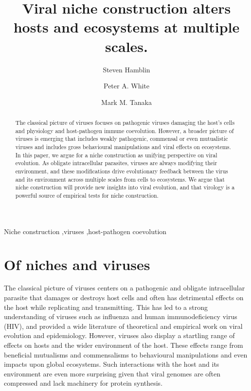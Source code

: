 \documentclass[review,draft,12pt]{elsarticle}
\begin{document}
\begin{frontmatter}
  \title{Viral niche construction alters hosts and ecosystems at multiple scales.}
  \author[babs]{Steven Hamblin}
  \author[babs]{Peter A. White}
  \author[babs]{Mark M. Tanaka}

  \address[unsw]{School of Biotechnology and Biomolecular Sciences, University of New South Wales, Sydney, Australia 2052}
 

\begin{abstract}
The classical picture of viruses focuses on pathogenic viruses damaging the host’s cells and physiology and host-pathogen immune coevolution. However, a broader picture of viruses is emerging that includes weakly pathogenic, commensal or even mutualistic viruses and includes gross behavioural manipulations and viral effects on ecosystems. In this paper, we argue for a niche construction as unifying perspective on viral evolution. As obligate intracellular parasites, viruses are always modifying their environment, and these modifications drive evolutionary feedback between the virus and its environment across multiple scales from cells to ecosystems. We argue that niche construction will provide new insights into viral evolution, and that virology is a powerful source of empirical tests for niche construction. 
\end{abstract}

\begin{keyword}
Niche construction \sep viruses \sep host-pathogen coevolution
\end{keyword}
\end{frontmatter}

\section{Of niches and viruses}\label{of-niches-and-viruses}

The classical picture of viruses centers on a pathogenic and obligate
intracellular parasite that damages or destroys host cells and often has
detrimental effects on the host while replicating and transmitting. This
has led to a strong understanding of viruses such as influenza and human
immunodeficiency virus (HIV), and provided a wide literature of
theoretical and empirical work on viral evolution and epidemiology.
However, viruses also display a startling range of effects on hosts and
the wider environment of the host. These effects range from beneficial
mutualisms and commensalisms to behavioural manipulations and even
impacts upon global ecosystems. Such interactions with the host and its
environment are even more surprising given that viral genomes are often
compressed and lack machinery for protein synthesis.
\end{document}
